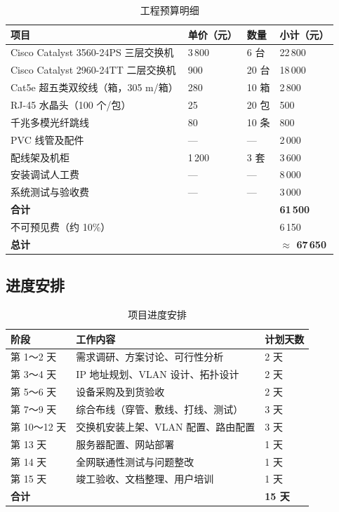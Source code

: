 \documentclass[12pt,a4paper]{ctexart}
\begin{document}
\begin{table}[H]
\centering
\caption{工程预算明细}
\begin{tabular}{L{5.5cm}C{2cm}C{2cm}C{2.5cm}}
\toprule
\textbf{项目} & \textbf{单价（元）} & \textbf{数量} & \textbf{小计（元）} \\
\midrule
Cisco Catalyst 3560-24PS 三层交换机 & 3\,800 & 6 台  & 22\,800 \\
Cisco Catalyst 2960-24TT 二层交换机 & 900   & 20 台 & 18\,000 \\
Cat5e 超五类双绞线（箱，305 m/箱）  & 280   & 10 箱 & 2\,800  \\
RJ-45 水晶头（100 个/包）           & 25    & 20 包 & 500     \\
千兆多模光纤跳线                    & 80    & 10 条 & 800     \\
PVC 线管及配件                      & ---   & ---   & 2\,000  \\
配线架及机柜                        & 1\,200 & 3 套 & 3\,600  \\
安装调试人工费                      & ---   & ---   & 8\,000  \\
系统测试与验收费                    & ---   & ---   & 3\,000  \\
\midrule
\textbf{合计}                       & & & \textbf{61\,500} \\
不可预见费（约 10\%）               & & & 6\,150  \\
\midrule
\textbf{总计}                       & & & \textbf{$\approx$ 67\,650} \\
\bottomrule
\end{tabular}
\end{table}

\subsection{进度安排}

\begin{table}[H]
\centering
\caption{项目进度安排}
\begin{tabular}{L{3.5cm}L{8cm}C{2cm}}
\toprule
\textbf{阶段} & \textbf{工作内容} & \textbf{计划天数} \\
\midrule
第 1～2 天  & 需求调研、方案讨论、可行性分析               & 2 天 \\
第 3～4 天  & IP 地址规划、VLAN 设计、拓扑设计             & 2 天 \\
第 5～6 天  & 设备采购及到货验收                           & 2 天 \\
第 7～9 天  & 综合布线（穿管、敷线、打线、测试）           & 3 天 \\
第 10～12 天& 交换机安装上架、VLAN 配置、路由配置          & 3 天 \\
第 13 天    & 服务器配置、网站部署                         & 1 天 \\
第 14 天    & 全网联通性测试与问题整改                     & 1 天 \\
第 15 天    & 竣工验收、文档整理、用户培训                 & 1 天 \\
\midrule
\textbf{合计} & & \textbf{15 天} \\
\bottomrule
\end{tabular}
\end{table}
\end{document}
